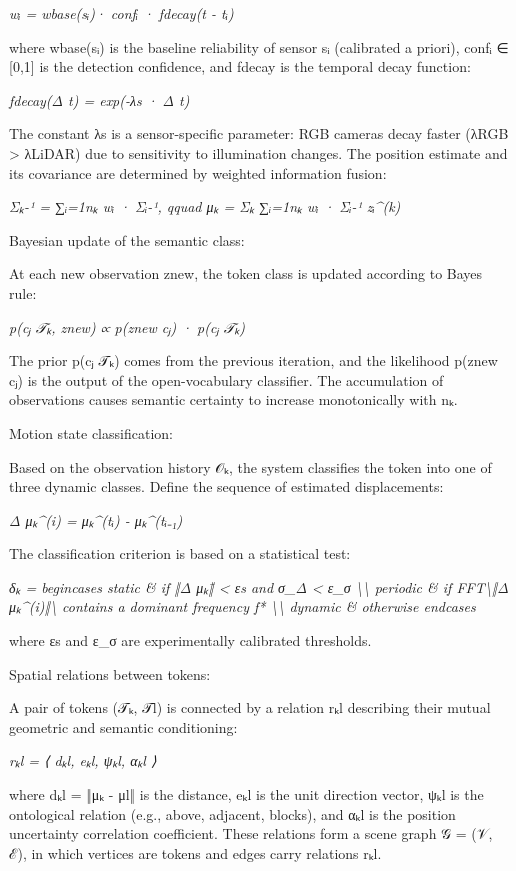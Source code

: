 \documentclass[
]{article}
\begin{document}
\emph{wᵢ = wbase(sᵢ)· confᵢ · fdecay(t - tᵢ)}

where wbase(sᵢ) is the baseline reliability of sensor sᵢ (calibrated a
priori), confᵢ ∈ {[}0,1{]} is the detection confidence, and fdecay is
the temporal decay function:

\emph{fdecay(Δ t) = exp(-λs · Δ t)}

The constant λs is a sensor-specific parameter: RGB cameras decay faster
(λRGB \textgreater{} λLiDAR) due to sensitivity to illumination changes.
The position estimate and its covariance are determined by weighted
information fusion:

\emph{Σₖ-¹ = ∑ᵢ=1nₖ wᵢ · Σᵢ-¹, qquad μₖ = Σₖ ∑ᵢ=1nₖ wᵢ · Σᵢ-¹ zᵢ\^{}(k)}

Bayesian update of the semantic class:

At each new observation znew, the token class is updated according to
Bayes\textquotesingle{} rule:

\emph{p(cⱼ \textbar{} 𝒯ₖ, znew) ∝ p(znew \textbar{} cⱼ) · p(cⱼ
\textbar{} 𝒯ₖ)}

The prior p(cⱼ \textbar{} 𝒯ₖ) comes from the previous iteration, and the
likelihood p(znew \textbar{} cⱼ) is the output of the open-vocabulary
classifier. The accumulation of observations causes semantic certainty
to increase monotonically with nₖ.

Motion state classification:

Based on the observation history 𝒪ₖ, the system classifies the token
into one of three dynamic classes. Define the sequence of estimated
displacements:

\emph{Δ μₖ\^{}(i) = μₖ\^{}(tᵢ) - μₖ\^{}(tᵢ₋₁)}

The classification criterion is based on a statistical test:

\emph{δₖ = begincases static \& if ‖Δ μₖ‖̄ \textless{} εs and σ\_Δ
\textless{} ε\_σ \textbackslash\textbackslash{} periodic \& if
FFT\textbackslash‖Δ μₖ\^{}(i)‖\textbackslash{} contains a dominant
frequency f* \textbackslash\textbackslash{} dynamic \& otherwise
endcases}

where εs and ε\_σ are experimentally calibrated thresholds.

Spatial relations between tokens:

A pair of tokens (𝒯ₖ, 𝒯l) is connected by a relation rₖl describing
their mutual geometric and semantic conditioning:

\emph{rₖl = ⟨ dₖl, eₖl, ψₖl, αₖl ⟩}

where dₖl = ‖μₖ - μl‖ is the distance, eₖl is the unit direction vector,
ψₖl is the ontological relation (e.g., above, adjacent, blocks), and αₖl
is the position uncertainty correlation coefficient. These relations
form a scene graph 𝒢 = (𝒱, ℰ), in which vertices are tokens and edges
carry relations rₖl.
\end{document}
